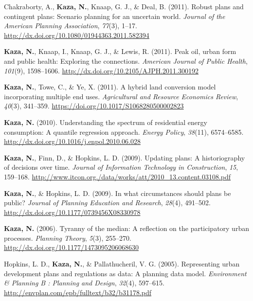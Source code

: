\documentclass[11pt,a4paper,]{awesome-cv}
\newlength{\cslhangindent}
\newenvironment{CSLReferences}[2] %
 {\begin{list}{}{%
  \setlength{\itemindent}{0pt}
  \setlength{\leftmargin}{0pt}
  \setlength{\parsep}{0pt}
  \ifodd #1
   \setlength{\leftmargin}{\cslhangindent}
   \setlength{\itemindent}{-1\cslhangindent}
  \fi
  \setlength{\itemsep}{#2\baselineskip}}}
 {\end{list}}
\begin{document}
\begin{CSLReferences}{1}{0}
Chakraborty, A., \textbf{Kaza, N.}, Knaap, G. J., \& Deal, B. (2011).
Robust plans and contingent plans: Scenario planning for an uncertain
world. \emph{Journal of the American Planning Association},
\emph{77}(3), 1--17.
\url{http://dx.doi.org/10.1080/01944363.2011.582394}

\textbf{Kaza, N.}, Knaap, I., Knaap, G. J., \& Lewis, R. (2011). Peak
oil, urban form and public health: Exploring the connections.
\emph{American Journal of Public Health}, \emph{101}(9), 1598--1606.
\url{http://dx.doi.org/10.2105/AJPH.2011.300192}

\textbf{Kaza, N.}, Towe, C., \& Ye, X. (2011). A hybrid land conversion
model incorporating multiple end uses. \emph{Agricultural and Resource
Economics Review}, \emph{40}(3), 341--359.
\url{https://doi.org/10.1017/S1068280500002823}

\textbf{Kaza, N.} (2010). Understanding the spectrum of residential
energy consumption: A quantile regression approach. \emph{Energy
Policy}, \emph{38}(11), 6574--6585.
\url{http://dx.doi.org/10.1016/j.enpol.2010.06.028}

\textbf{Kaza, N.}, Finn, D., \& Hopkins, L. D. (2009). Updating plans: A
historiography of decisions over time. \emph{Journal of Information
Technology in Construction}, \emph{15}, 159--168.
\url{http://www.itcon.org./data/works/att/2010_13.content.03108.pdf}

\textbf{Kaza, N.}, \& Hopkins, L. D. (2009). In what circumstances
should plans be public? \emph{Journal of Planning Education and
Research}, \emph{28}(4), 491--502.
\url{http://dx.doi.org/10.1177/0739456X08330978}

\textbf{Kaza, N.} (2006). Tyranny of the median: A reflection on the
participatory urban processes. \emph{Planning Theory}, \emph{5}(3),
255--270. \url{http://dx.doi.org/10.1177/1473095206068630}

Hopkins, L. D., \textbf{Kaza, N.}, \& Pallathucheril, V. G. (2005).
Representing urban development plans and regulations as data: A planning
data model. \emph{Environment \& Planning B : Planning and Design},
\emph{32}(4), 597--615.
\url{http://envplan.com/epb/fulltext/b32/b31178.pdf}

\end{CSLReferences}
\end{document}
